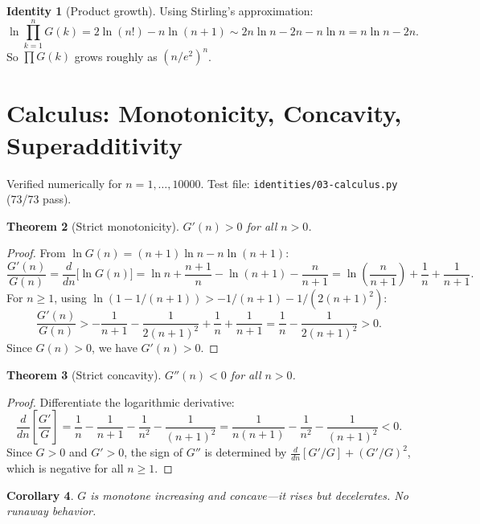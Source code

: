 \documentclass[11pt,a4paper]{article}
\newtheorem{theorem}{Theorem}[section]
\newtheorem{corollary}[theorem]{Corollary}
\theoremstyle{definition}
\newtheorem{identity}[theorem]{Identity}
\theoremstyle{remark}
\begin{document}
\begin{identity}[Product growth]\label{id:prodgrowth}
Using Stirling's approximation:
\begin{equation}\label{eq:prodgrowth}
  \ln\prod_{k=1}^{n}G(k) = 2\ln(n!) - n\ln(n+1) \sim 2n\ln n - 2n - n\ln n = n\ln n - 2n.
\end{equation}
So $\prod G(k)$ grows roughly as $(n/e^{2})^{n}$.
\end{identity}

\section{Calculus: Monotonicity, Concavity, Superadditivity}\label{sec:calculus}

Verified numerically for $n=1,\ldots,10000$. Test file: \texttt{identities/03-calculus.py} (73/73 pass).

\begin{theorem}[Strict monotonicity]\label{thm:mono}
$G'(n) > 0$ for all $n > 0$.
\end{theorem}

\begin{proof}
From $\ln G(n) = (n+1)\ln n - n\ln(n+1)$:
\[
  \frac{G'(n)}{G(n)} = \frac{d}{dn}\bigl[\ln G(n)\bigr] = \ln n + \frac{n+1}{n} - \ln(n+1) - \frac{n}{n+1}
  = \ln\!\left(\frac{n}{n+1}\right) + \frac{1}{n} + \frac{1}{n+1}.
\]
For $n \ge 1$, using $\ln(1 - 1/(n+1)) > -1/(n+1) - 1/(2(n+1)^{2})$:
\[
  \frac{G'(n)}{G(n)} > -\frac{1}{n+1} - \frac{1}{2(n+1)^{2}} + \frac{1}{n} + \frac{1}{n+1} = \frac{1}{n} - \frac{1}{2(n+1)^{2}} > 0.
\]
Since $G(n)>0$, we have $G'(n)>0$.
\end{proof}

\begin{theorem}[Strict concavity]\label{thm:concave}
$G''(n) < 0$ for all $n > 0$.
\end{theorem}

\begin{proof}
Differentiate the logarithmic derivative:
\[
  \frac{d}{dn}\!\left[\frac{G'}{G}\right] = \frac{1}{n} - \frac{1}{n+1} - \frac{1}{n^{2}} - \frac{1}{(n+1)^{2}}
  = \frac{1}{n(n+1)} - \frac{1}{n^{2}} - \frac{1}{(n+1)^{2}} < 0.
\]
Since $G>0$ and $G'>0$, the sign of $G''$ is determined by $\frac{d}{dn}[G'/G]+(G'/G)^{2}$, which is negative for all $n\ge 1$.
\end{proof}

\begin{corollary}\label{cor:shape}
$G$ is monotone increasing and concave---it rises but decelerates. No runaway behavior.
\end{corollary}
\end{document}
